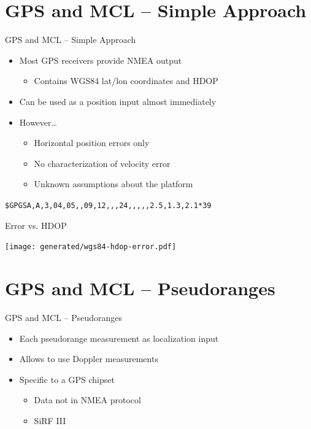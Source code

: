 \documentclass[utf8,12pt]{beamer}
\begin{document}
\section{GPS and MCL -- Simple Approach}
{
\begin{frame}[fragile]{GPS and MCL -- Simple Approach}
    \begin{itemize}
        \item Most GPS receivers provide NMEA output
        \begin{itemize}
            \item Contains WGS84 lat/lon coordinates and HDOP
        \end{itemize}
        \item Can be used as a position input almost immediately
    \item However\ldots
        \begin{itemize}
            \item Horizontal position errors only
            \item No characterization of velocity error
            \item Unknown assumptions about the platform
        \end{itemize}
    \end{itemize}

    \vspace{0.5cm}
    \begin{center}
    \small \verb=$GPGSA,A,3,04,05,,09,12,,,24,,,,,2.5,1.3,2.1*39=
    \end{center}
\end{frame}
}

\begin{frame}[plain]{Error vs. HDOP}
\begin{center}
\centerline{\texttt{[image: generated/wgs84-hdop-error.pdf]}}
\end{center}
\end{frame}

\section{GPS and MCL -- Pseudoranges}
\begin{frame}{GPS and MCL -- Pseudoranges}
    \begin{itemize}
        \item Each pseudorange measurement as localization input
        \item Allows to use Doppler measurements
        \item Specific to a GPS chipset
        \begin{itemize}
            \item Data not in NMEA protocol
            \item SiRF III
        \end{itemize}
    \end{itemize}
\end{frame}
\end{document}
